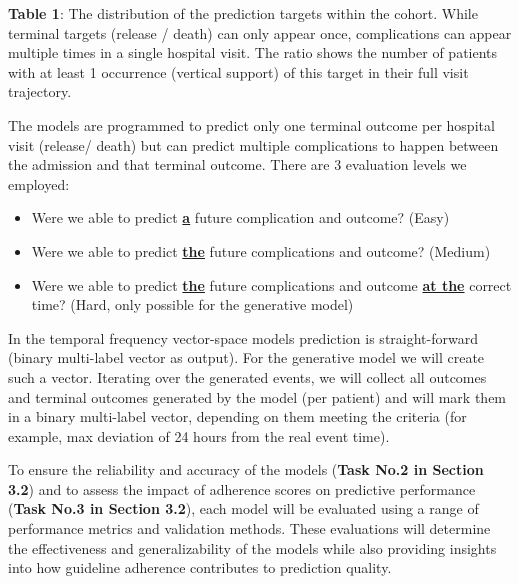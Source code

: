 \documentclass[
]{article}
\begin{document}
\textbf{Table 1}: The distribution of the prediction targets within the
cohort. While terminal targets (release / death) can only appear once,
complications can appear multiple times in a single hospital visit. The
ratio shows the number of patients with at least 1 occurrence (vertical
support) of this target in their full visit trajectory.

The models are programmed to predict only one terminal outcome per
hospital visit (release/ death) but can predict multiple complications
to happen between the admission and that terminal outcome. There are 3
evaluation levels we employed:

\begin{itemize}
\item
  Were we able to predict \textbf{\ul{a}} future complication and
  outcome? (Easy)
\item
  Were we able to predict \textbf{\ul{the}} future complications and
  outcome? (Medium)
\item
  Were we able to predict \textbf{\ul{the}} future complications and
  outcome \textbf{\ul{at the}} correct time? (Hard, only possible for
  the generative model)
\end{itemize}

In the temporal frequency vector-space models prediction is
straight-forward (binary multi-label vector as output). For the
generative model we will create such a vector. Iterating over the
generated events, we will collect all outcomes and terminal outcomes
generated by the model (per patient) and will mark them in a binary
multi-label vector, depending on them meeting the criteria (for example,
max deviation of 24 hours from the real event time).

To ensure the reliability and accuracy of the models (\textbf{Task No.2
in Section 3.2}) and to assess the impact of adherence scores on
predictive performance (\textbf{Task No.3 in Section 3.2}), each model
will be evaluated using a range of performance metrics and validation
methods. These evaluations will determine the effectiveness and
generalizability of the models while also providing insights into how
guideline adherence contributes to prediction quality.
\end{document}
